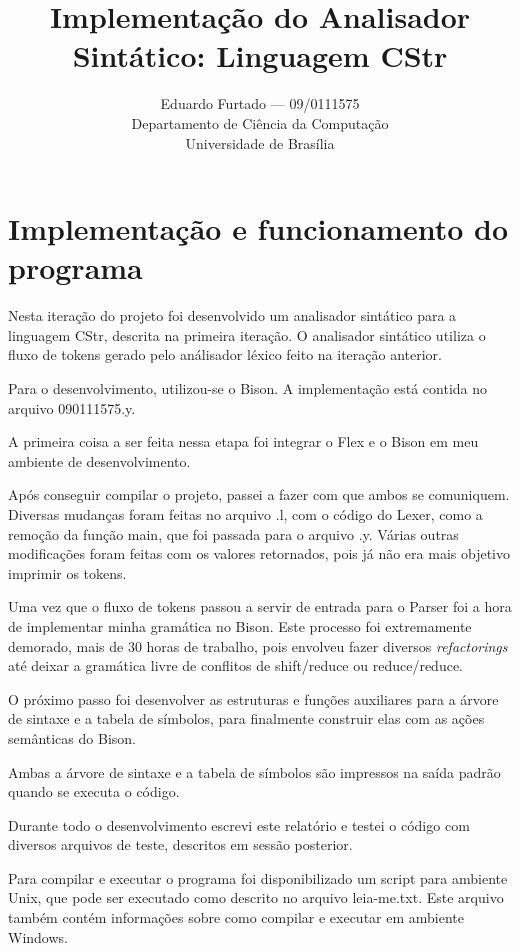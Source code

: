 \documentclass[12pt]{article}
\title{Implementação do Analisador Sintático: Linguagem CStr}
\author{Eduardo Furtado --- 09/0111575\\Departamento de Ciência da Computação\\Universidade de Brasília}
\begin{document}
\maketitle


\section{Implementação e funcionamento do programa}

\indent

Nesta iteração do projeto foi desenvolvido um analisador sintático para a linguagem CStr, descrita na primeira iteração. O analisador sintático utiliza o fluxo de tokens gerado pelo análisador léxico feito na iteração anterior.

Para o desenvolvimento, utilizou-se o Bison. A implementação está contida no arquivo 090111575.y.

A primeira coisa a ser feita nessa etapa foi integrar o Flex e o Bison em meu ambiente de desenvolvimento.

Após conseguir compilar o projeto, passei a fazer com que ambos se comuniquem. Diversas mudanças foram feitas no arquivo .l, com o código do Lexer, como a remoção da função main, que foi passada para o arquivo .y. Várias outras modificações foram feitas com os valores retornados, pois já não era mais objetivo imprimir os tokens.

Uma vez que o fluxo de tokens passou a servir de entrada para o Parser foi a hora de implementar minha gramática no Bison. Este processo foi extremamente demorado, mais de 30 horas de trabalho, pois envolveu fazer diversos \textit{refactorings} até deixar a gramática livre de conflitos de shift/reduce ou reduce/reduce.

O próximo passo foi desenvolver as estruturas e funções auxiliares para a árvore de sintaxe e a tabela de símbolos, para finalmente construir elas com as ações semânticas do Bison.

Ambas a árvore de sintaxe e a tabela de símbolos são impressos na saída padrão quando se executa o código.

Durante todo o desenvolvimento escrevi este relatório e testei o código com diversos arquivos de teste, descritos em sessão posterior.

Para compilar e executar o programa foi disponibilizado um script para ambiente Unix, que pode ser executado como descrito no arquivo leia-me.txt. Este arquivo também contém informações sobre como compilar e executar em ambiente Windows.
\end{document}

